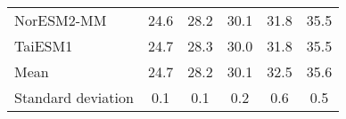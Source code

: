 \begin{table}
\begin{tabular}{lccccc}
    NorESM2-MM         & 24.6                         & 28.2                         & 30.1                         & 31.8                         & 35.5                         \\
    TaiESM1            & 24.7                         & 28.3                         & 30.0                         & 31.8                         & 35.5                         \\
    \hline
    Mean               & 24.7                         & 28.2                         & 30.1                         & 32.5                         & 35.6                         \\
    Standard deviation & 0.1                          & 0.1                          & 0.2                          & 0.6                          & 0.5                          \\
  \end{tabular}
\end{table}

